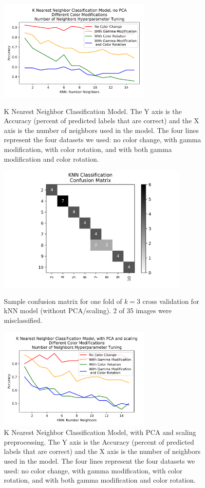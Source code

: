 \documentclass[journal]{IEEEtran}
\begin{document}
\begin{figure}
\centering
\includegraphics[height=2in]{KNN_clf_noPCA/knn_classification.png}
\caption{K Nearest Neighbor Classification Model. The Y axis is the Accuracy (percent of predicted labels that are correct) and the X axis is the number of neighbors used in the model. The four lines represent the four datasets we used: no color change, with gamma modification, with color rotation, and with both gamma modification and color rotation.}
\label{knn}

\centering
\includegraphics[height=2.5in]{KNN_clf_noPCA/KNN_classification_cfm.png}
\caption{Sample confusion matrix for one fold of $k=3$ cross validation for kNN model (without PCA/scaling). 2 of 35 images were misclassified.}
\label{knn_confusion}

\centering
\includegraphics[height=2in]{KNN_clf_PCA/knn_classification.png}
\caption{K Nearest Neighbor Classification Model, with PCA and scaling preprocessing. The Y axis is the Accuracy (percent of predicted labels that are correct) and the X axis is the number of neighbors used in the model. The four lines represent the four datasets we used: no color change, with gamma modification, with color rotation, and with both gamma modification and color rotation.}
\label{knn_pca}
\end{figure}
\end{document}
